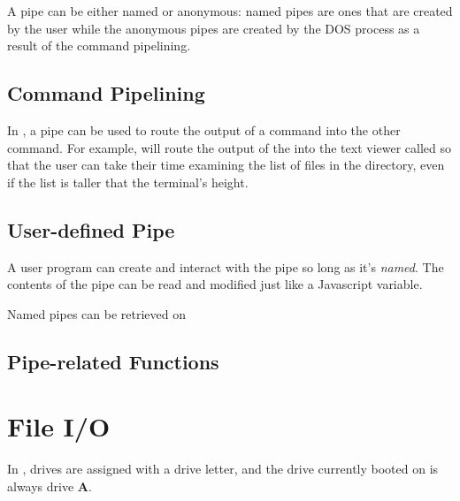 A pipe can be either named or anonymous: named pipes are ones that are created by the user while the anonymous pipes are created by the DOS process as a result of the command pipelining.

\section{Command Pipelining}

In \thedos, a pipe can be used to route the output of a command into the other command. For example,  will route the output of the  into the text viewer called  so that the user can take their time examining the list of files in the directory, even if the list is taller that the terminal's height.

\section{User-defined Pipe}

A user program can create and interact with the pipe so long as it's \emph{named}. The contents of the pipe can be read and modified just like a Javascript variable.

Named pipes can be retrieved on 

\section{Pipe-related Functions}

\begin{outline}
\1
\1
\1
\1
\1
\1
\end{outline}


\chapter{File I/O}
In \thedos, drives are assigned with a drive letter, and the drive currently booted on is always drive \textbf{A}.


